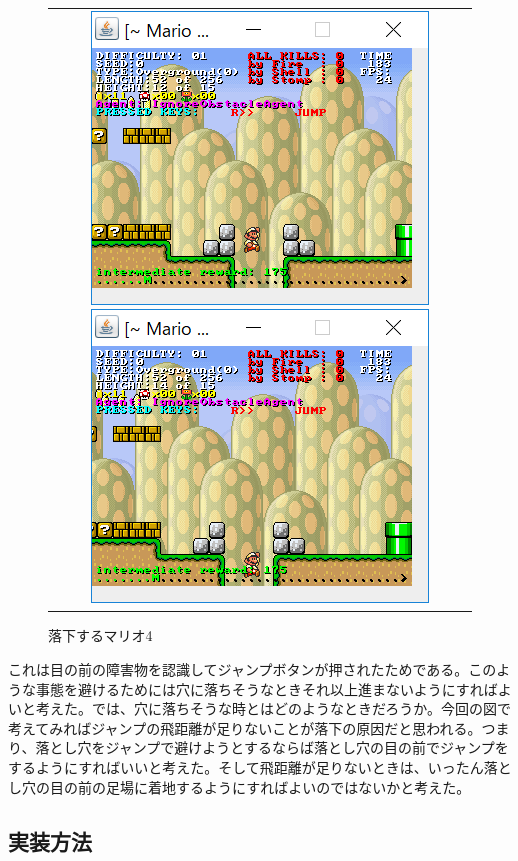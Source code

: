 \documentclass{jsarticle}
\begin{document}
\begin{figure}[H]
\begin{tabular}{c}
	\begin{minipage}{0.50\hsize}
		\includegraphics{falling3.png}
		\caption{落下するマリオ3}
	\end{minipage}
	\begin{minipage}{0.50\hsize}
		\includegraphics{falling4.png}
		\caption{落下するマリオ4}
	\end{minipage}
	\end{tabular}
\end{figure}
これは目の前の障害物を認識してジャンプボタンが押されたためである。このような事態を避けるためには穴に落ちそうなときそれ以上進まないようにすればよいと考えた。では、穴に落ちそうな時とはどのようなときだろうか。今回の図で考えてみればジャンプの飛距離が足りないことが落下の原因だと思われる。つまり、落とし穴をジャンプで避けようとするならば落とし穴の目の前でジャンプをするようにすればいいと考えた。そして飛距離が足りないときは、いったん落とし穴の目の前の足場に着地するようにすればよいのではないかと考えた。

\subsection{実装方法}
\end{document}
